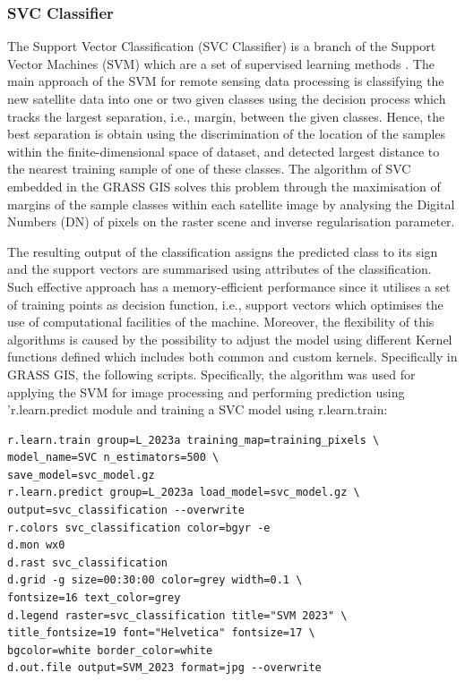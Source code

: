\documentclass[eprint,
approc,		%
]{actapoly}
\begin{document}
\subsubsection{SVC Classifier}

The Support Vector Classification (SVC Classifier) is a branch of the Support Vector Machines (SVM) which are a set of supervised learning methods \citep{Cortes}. The main approach of the SVM for remote sensing data processing is classifying the new satellite data into one or two given classes using the decision process which tracks the largest separation, i.e., margin, between the given classes. Hence, the best separation is obtain using the discrimination of the location of the samples within the finite-dimensional space of dataset, and detected largest distance to the nearest training sample of one of these classes. The algorithm of SVC embedded in the GRASS GIS solves this problem through the maximisation of margins of the sample classes within each satellite image by analysing the Digital Numbers (DN) of pixels on the raster scene and inverse regularisation parameter. 

The resulting output of the classification assigns the predicted class to its sign and the support vectors are summarised using attributes of the classification. Such effective approach has a memory-efficient performance since it utilises a set of training points as decision function, i.e., support vectors which optimises the use of computational facilities of the machine. Moreover, the flexibility of this algorithms is caused by the possibility to adjust the model using different Kernel functions defined which includes both common and custom kernels. Specifically in GRASS GIS, the following scripts. Specifically, the algorithm was used for applying the SVM for image processing and performing prediction using 'r.learn.predict module and training a SVC model using r.learn.train:

\begin{footnotesize}
\begin{verbatim}
r.learn.train group=L_2023a training_map=training_pixels \
model_name=SVC n_estimators=500 \
save_model=svc_model.gz 
r.learn.predict group=L_2023a load_model=svc_model.gz \
output=svc_classification --overwrite
r.colors svc_classification color=bgyr -e
d.mon wx0
d.rast svc_classification
d.grid -g size=00:30:00 color=grey width=0.1 \
fontsize=16 text_color=grey
d.legend raster=svc_classification title="SVM 2023" \
title_fontsize=19 font="Helvetica" fontsize=17 \
bgcolor=white border_color=white
d.out.file output=SVM_2023 format=jpg --overwrite
\end{verbatim}
\end{footnotesize}
\end{document}
